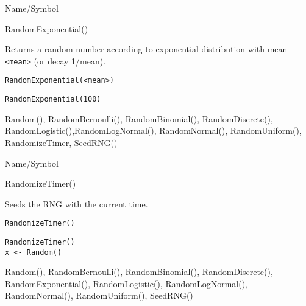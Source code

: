 \rl


\begin{desc}{Name/Symbol}
\item[Name/Symbol]	RandomExponential()

\item[Description]	Returns a random number according to exponential 
		distribution with mean \verb+<mean>+ (or decay 1/mean).

\item[Usage]		
\begin{verbatim}
RandomExponential(<mean>)
\end{verbatim}

\item[Example]	
\begin{verbatim}
RandomExponential(100)
\end{verbatim}

\item[See Also]	Random(), RandomBernoulli(), RandomBinomial(),
		RandomDiscrete(), RandomLogistic(),RandomLogNormal(), 
		RandomNormal(), RandomUniform(), RandomizeTimer, SeedRNG()
\end{desc}

\rl                            


\begin{desc}{Name/Symbol}
\item[Name/Symbol]	RandomizeTimer()

\item[Description]	Seeds the RNG with the current time.

\item[Usage]
\begin{verbatim}
RandomizeTimer()
\end{verbatim}

\item[Example]	
\begin{verbatim}
RandomizeTimer()
x <- Random()
\end{verbatim}
	     
\item[See Also]	Random(), RandomBernoulli(), RandomBinomial(),
		RandomDiscrete(), RandomExponential(), RandomLogistic(),
		RandomLogNormal(), RandomNormal(), RandomUniform(), SeedRNG()
\end{desc}

\rl



